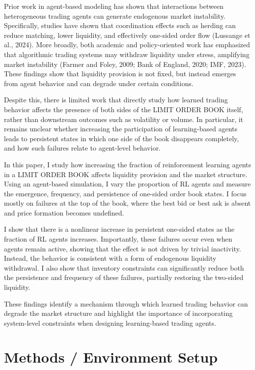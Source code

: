 \documentclass[11pt]{article}
\begin{document}
Prior work in agent-based modeling has shown that interactions between heterogeneous trading agents can generate endogenous market instability. Specifically, studies have shown that coordination effects such as herding can reduce matching, lower liquidity, and effectively one-sided order flow (Lussange et al., 2024). More broadly, both academic and policy-oriented work has emphasized that algorithmic trading systems may withdraw liquidity under stress, amplifying market instability (Farmer and Foley, 2009; Bank of England, 2020; IMF, 2023). These findings show that liquidity provision is not fixed, but instead emerges from agent behavior and can degrade under certain conditions.

Despite this, there is limited work that directly study how learned trading behavior affects the presence of both sides of the LIMIT ORDER BOOK itself, rather than downstream outcomes such as volatility or volume. In particular, it remains unclear whether increasing the participation of learning-based agents leads to persistent states in which one side of the book disappears completely, and how such failures relate to agent-level behavior.

In this paper, I study how increasing the fraction of reinforcement learning agents in a LIMIT ORDER BOOK affects liquidity provision and the market structure. Using an agent-based simulation, I vary the proportion of RL agents and measure the emergence, frequency, and persistence of one-sided order book states. I focus mostly on failures at the top of the book, where the best bid or best ask is absent and price formation becomes undefined.

I show that there is a nonlinear increase in persistent one-sided states as the fraction of RL agents increases. Importantly, these failures occur even when agents remain active, showing that the effect is not driven by trivial inactivity. Instead, the behavior is consistent with a form of endogenous liquidity withdrawal. I also show that inventory constraints can significantly reduce both the persistence and frequency of these failures, partially restoring the two-sided liquidity.

These findings identify a mechanism through which learned trading behavior can degrade the market structure and highlight the importance of incorporating system-level constraints when designing learning-based trading agents.

\section{Methods / Environment Setup}
\end{document}
